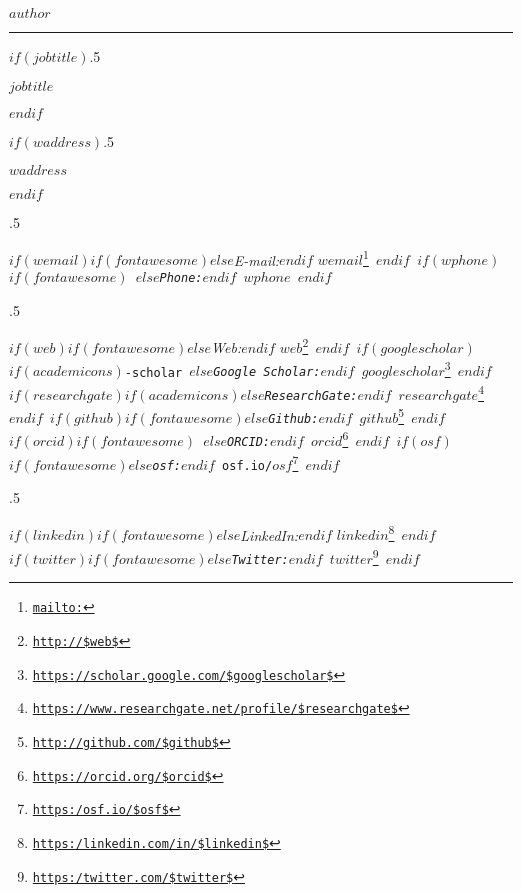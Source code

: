 \documentclass[$if(fontsize)$$fontsize$,$endif$$if(lang)$$babel-lang$,$endif$$if(papersize)$$papersize$paper,$endif$$for(classoption)$$classoption$$sep$,$endfor$]{$documentclass$}
\renewcommand{\href}[2]{#2\footnote{\url{#1}}}
\begin{document}
\thispagestyle{firstpage} %

\centerline{\huge \bf $author$}

\vspace{2 mm}

\hrule

\vspace{2 mm}

$if(jobtitle)$\moveleft.5\hoffset\centerline{$jobtitle$}$endif$

$if(waddress)$\moveleft.5\hoffset\centerline{$waddress$}$endif$

\moveleft.5\hoffset\centerline{ $if(wemail)$$if(fontawesome)$\faEnvelopeO \hspace{1 mm}$else$\emph{E-mail:}$endif$ \href{mailto:}{\tt $wemail$} \hspace{1 mm}$endif$ $if(wphone)$$if(fontawesome)$ \faPhone \hspace{1 mm}$else$\emph{Phone:}$endif$  $wphone$  \hspace{1 mm} $endif$} 

\moveleft.5\hoffset\centerline{ $if(web)$$if(fontawesome)$\faGlobe \hspace{1 mm}$else$\emph{Web:}$endif$ \href{http://$web$}{\tt $web$} \hspace{1 mm} $endif$ $if(googlescholar)$$if(academicons)$\aigoogle-scholar \hspace{.5 mm}$else$\emph{Google Scholar:}$endif$ \href{https://scholar.google.com/$googlescholar$}{\tt $googlescholar$} \hspace{1 mm}$endif$ $if(researchgate)$$if(academicons)$\airesearchgate \hspace{.5 mm}$else$\emph{ResearchGate:}$endif$ \href{https://www.researchgate.net/profile/$researchgate$}{\tt $researchgate$}$endif$ $if(github)$$if(fontawesome)$\faGithub \hspace{1 mm}$else$\emph{Github:}$endif$ \href{http://github.com/$github$}{\tt $github$} \hspace{1 mm}$endif$ $if(orcid)$$if(fontawesome)$ \hspace{.5 mm}$else$\emph{ORCID:}$endif$ \href{https://orcid.org/$orcid$}{\tt $orcid$} \hspace{1 mm}$endif$ $if(osf)$$if(fontawesome)$\faUnlock \hspace{1 mm}$else$\emph{osf:}$endif$ \href{https:/osf.io/$osf$}{\tt osf.io/$osf$} \hspace{1 mm}$endif$}

\moveleft.5\hoffset\centerline{ $if(linkedin)$$if(fontawesome)$\faLinkedIn \hspace{1 mm}$else$\emph{LinkedIn:}$endif$ \href{https:/linkedin.com/in/$linkedin$}{\tt $linkedin$} \hspace{1 mm} $endif$ $if(twitter)$$if(fontawesome)$\faTwitter \hspace{1 mm}$else$\emph{Twitter:}$endif$ \href{https:/twitter.com/$twitter$}{\tt $twitter$} \hspace{1 mm} $endif$}
\end{document}
